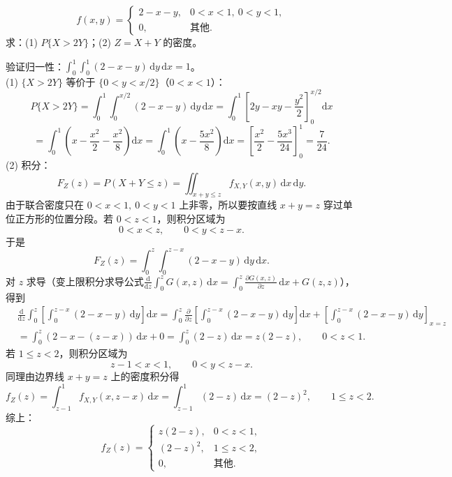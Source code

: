 \documentclass[lang=cn,11pt]{elegantbook}
\begin{document}
\begin{exercise}[三角形均匀分布求概率] \label{exer:3-c14}
\[f(x,y) = \begin{cases} 2-x-y, & 0 < x < 1,\ 0 < y < 1, \\ 0, & \text{其他}. \end{cases}\]
求：(1) $P\{X > 2Y\}$；(2) $Z = X+Y$ 的密度。
\end{exercise}
\begin{solution}
验证归一性：$\int_0^1\int_0^1(2-x-y)\,\mathrm{d}y\,\mathrm{d}x = 1$。\\
(1) $\{X > 2Y\}$ 等价于 $\{0 < y < x/2\}$（$0 < x < 1$）：
\[
P\{X > 2Y\} = \int_0^1\int_0^{x/2}(2-x-y)\,\mathrm{d}y\,\mathrm{d}x = \int_0^1\left[2y-xy-\frac{y^2}{2}\right]_0^{x/2}\mathrm{d}x
\]
\[
= \int_0^1\left(x - \frac{x^2}{2} - \frac{x^2}{8}\right)\mathrm{d}x = \int_0^1\left(x - \frac{5x^2}{8}\right)\mathrm{d}x = \left[\frac{x^2}{2} - \frac{5x^3}{24}\right]_0^1 = \frac{7}{24}.
\]
(2) 积分：
\[
F_Z(z)=P(X+Y\le z)
=\iint_{x+y\le z} f_{X,Y}(x,y)\,\mathrm{d}x\,\mathrm{d}y.
\]
由于联合密度只在 $0<x<1,\ 0<y<1$ 上非零，所以要按直线 $x+y=z$ 穿过单位正方形的位置分段。若 $0<z<1$，则积分区域为
\[
0<x<z,\qquad 0<y<z-x.
\]
于是
\[
F_Z(z)=\int_0^z\int_0^{z-x}(2-x-y)\,\mathrm{d}y\,\mathrm{d}x.
\]
对 $z$ 求导（变上限积分求导公式$\displaystyle\frac{\mathrm d}{\mathrm dz}\int_0^z G(x,z)\,\mathrm dx=\int_0^z \frac{\partial G(x,z)}{\partial z}\,\mathrm dx+G(z,z)$），得到
\begin{align*}
&\frac{\mathrm{d}}{\mathrm{d}z}
\int_0^z\left[\int_0^{z-x}(2-x-y)\,\mathrm{d}y\right]\mathrm{d}x=\int_0^z
\frac{\partial}{\partial z}\left[\int_0^{z-x}(2-x-y)\,\mathrm{d}y\right]\mathrm{d}x
+\left[\int_0^{z-x}(2-x-y)\,\mathrm{d}y\right]_{x=z}\\
&=\int_0^z (2-x-(z-x))\,\mathrm{d}x+0=\int_0^z(2-z)\,\mathrm{d}x=z(2-z),\qquad 0<z<1.
\end{align*}
若 $1\leqslant z<2$，则积分区域为
\[
z-1<x<1,\qquad 0<y<z-x.
\]
同理由边界线 $x+y=z$ 上的密度积分得
\[
f_Z(z)=\int_{z-1}^1 f_{X,Y}(x,z-x)\,\mathrm{d}x
=\int_{z-1}^1(2-z)\,\mathrm{d}x
=(2-z)^2,\qquad 1\leqslant z<2.
\]
综上：
\[
f_Z(z) = \begin{cases} z(2-z), & 0 < z < 1, \\ (2-z)^2, & 1 \leqslant z < 2, \\ 0, & \text{其他}. \end{cases}
\]
\end{solution}
\end{document}
